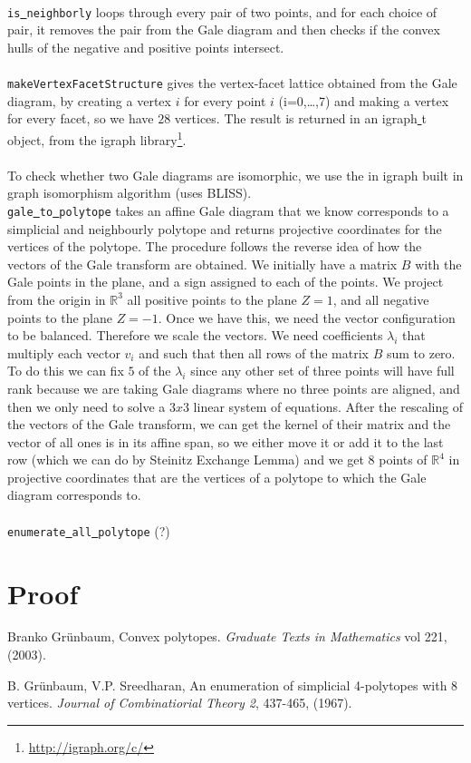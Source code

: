 \documentclass[paper=a4, fontsize=11pt]{scrartcl} %
\newcommand{\RR}{{\mathbb R}}
\theoremstyle{definition}
\begin{document}
\\
\texttt{is\underline{ }neighborly} loops through every pair of two points, and for each choice of pair, it removes the pair from the Gale diagram and then checks if the convex hulls of the negative and positive points intersect.\\
\\
\texttt{makeVertexFacetStructure} gives the vertex-facet lattice obtained from the Gale diagram, by creating a vertex $i$ for every point $i$ (i=0,\ldots,7) and making a vertex for every facet, so we have $28$ vertices. The result is returned in an igraph\underline{ }t object, from the igraph library\footnote{\url{http://igraph.org/c/}}. \\
\\
To check whether two Gale diagrams are isomorphic, we use the in igraph built in graph isomorphism algorithm (uses BLISS).
\\

\texttt{gale\underline{ }to\underline{ }polytope} takes an affine Gale diagram that we know corresponds to a simplicial and neighbourly polytope and returns projective coordinates for the vertices of the polytope. The procedure follows the reverse idea of how the vectors of the Gale transform are obtained. We initially have a matrix $B$ with the Gale points in the plane, and a sign assigned to each of the points. We project from the origin in $\RR^3$ all positive points to the plane $Z = 1$, and all negative points to the plane $Z = -1$. Once we have this, we need the vector configuration to be balanced. Therefore we scale the vectors. We need coefficients $\lambda_i$ that multiply each vector $v_i$ and such that then all rows of the matrix $B$ sum to zero. To do this we can fix $5$ of the $\lambda_i$ since any other set of three points will have full rank because we are taking Gale diagrams where no three points are aligned, and then we only need to solve a $3x3$ linear system of equations. After the rescaling of the vectors of the Gale transform, we can get the kernel of their matrix and the vector of all ones is in its affine span, so we either move it or add it to the last row (which we can do by Steinitz Exchange Lemma) and we get 8 points of $\RR^4$ in projective coordinates that are the vertices of a polytope to which the Gale diagram corresponds to.\\
\\
\texttt{enumerate\underline{ }all\underline{ }polytope} (?)
\section{Proof}

\begin{thebibliography}{9}

Branko Grünbaum, Convex polytopes. \textit{Graduate
Texts in Mathematics} vol 221, (2003).

B. Grünbaum, V.P. Sreedharan, An enumeration of simplicial 4-polytopes with 8 vertices. \textit{Journal of Combinatiorial Theory 2}, 437-465, (1967).

\end{thebibliography}
\end{document}

